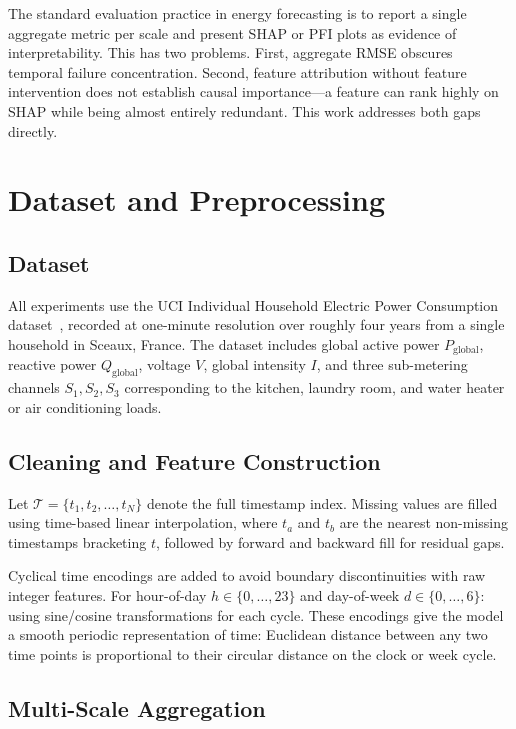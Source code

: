 \documentclass[10pt,twocolumn,letterpaper]{article}
\begin{document}
The standard evaluation practice in energy forecasting is to report a
single aggregate metric per scale and present SHAP or PFI plots as
evidence of interpretability. This has two problems. First, aggregate
RMSE obscures temporal failure concentration. Second, feature
attribution without feature intervention does not establish causal
importance---a feature can rank highly on SHAP while being almost
entirely redundant. This work addresses both gaps directly.

\section{Dataset and Preprocessing}

\subsection{Dataset}

All experiments use the UCI Individual Household Electric Power
Consumption dataset~\cite{uci2012}, recorded at one-minute resolution
over roughly four years from a single household in Sceaux, France. The
dataset includes global active power $P_{\text{global}}$, reactive
power $Q_{\text{global}}$, voltage $V$, global intensity $I$, and
three sub-metering channels $S_1, S_2, S_3$ corresponding to the
kitchen, laundry room, and water heater or air conditioning loads.

\subsection{Cleaning and Feature Construction}

Let $\mathcal{T} = \{t_1, t_2, \ldots, t_N\}$ denote the full
timestamp index. Missing values are filled using time-based linear
interpolation,
where $t_a$ and $t_b$ are the nearest non-missing timestamps bracketing
$t$, followed by forward and backward fill for residual gaps.

Cyclical time encodings are added to avoid boundary discontinuities
with raw integer features. For hour-of-day $h \in \{0,\ldots,23\}$
and day-of-week $d \in \{0,\ldots,6\}$:
using sine/cosine transformations for each cycle.
These encodings give the model a smooth periodic representation of
time: Euclidean distance between any two time points is proportional
to their circular distance on the clock or week cycle.

\subsection{Multi-Scale Aggregation}
\end{document}
